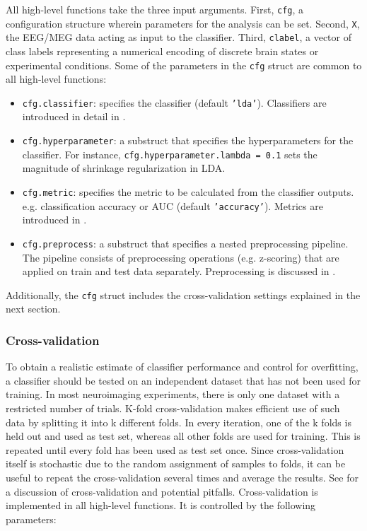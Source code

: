 \documentclass[utf8]{frontiersSCNS} %
\newcommand{\ttt}[1]{\texttt{#1}}
\begin{document}
All high-level functions take the three input arguments. First, \ttt{cfg}, a configuration structure wherein parameters for the analysis can be set. Second, \ttt{X}, the EEG/MEG data acting as input to the classifier. Third, \ttt{clabel}, a vector of class labels representing a numerical encoding of discrete brain states or experimental conditions. Some of the parameters in the \ttt{cfg} struct are common  to all high-level functions:

\begin{itemize}
    \item \ttt{cfg.classifier}: specifies the classifier (default \ttt{'lda'}). Classifiers are introduced in detail in .
    \item \ttt{cfg.hyperparameter}: a substruct that specifies the hyperparameters for the classifier. For instance, \ttt{cfg.hyperparameter.lambda = 0.1} sets the magnitude of shrinkage regularization in LDA.
    \item \ttt{cfg.metric}: specifies the metric to be calculated from the classifier outputs. e.g. classification accuracy or AUC (default \ttt{'accuracy'}). Metrics are introduced in .
    \item \ttt{cfg.preprocess}: a substruct that specifies a nested preprocessing pipeline. The pipeline consists of preprocessing operations (e.g. z-scoring) that are applied on train and test data separately. Preprocessing is discussed in .
\end{itemize}

Additionally, the \ttt{cfg} struct includes the cross-validation settings explained in the next section.


\subsubsection{Cross-validation}

To obtain a realistic estimate of classifier performance and control for overfitting, a classifier should be tested on an independent dataset that has not been used for training. In most neuroimaging experiments, there is only one dataset with a restricted number of trials. K-fold cross-validation makes efficient use of such data by splitting it into k different folds. In every iteration, one of the k folds is held out and used as test set, whereas all other folds are used for training. This is repeated until every fold has been used as test set once. Since cross-validation itself is stochastic due to the random assignment of samples to folds, it can be useful to repeat the cross-validation several times and average the results. See \cite{Lemm2011} for a discussion of cross-validation and potential pitfalls. Cross-validation is implemented in all high-level functions. It is controlled by the following parameters:
\end{document}
